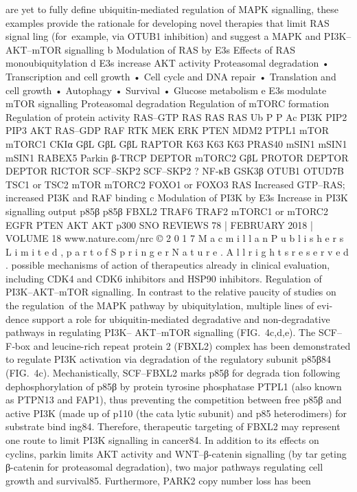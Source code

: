 are yet to fully define ubiquitin-mediated regulation of
MAPK signalling, these examples provide the rationale
for developing novel therapies that limit RAS signal­
ling (for example, via OTUB1 inhibition) and suggest
a MAPK and PI3K–AKT–mTOR signalling
b Modulation of RAS by E3s
Eﬀects of RAS monoubiquitylation
d E3s increase AKT activity
Proteasomal degradation
• Transcription and
   cell growth
• Cell cycle and
   DNA repair
• Translation and
    cell growth
• Autophagy
• Survival
• Glucose
   metabolism
e E3s modulate mTOR signalling
Proteasomal degradation
Regulation of mTORC formation
Regulation of protein activity
RAS–GTP
RAS
RAS
RAS
Ub
P
P
Ac
PI3K
PIP2
PIP3
AKT
RAS–GDP
RAF
RTK
MEK
ERK
PTEN
MDM2
PTPL1
mTOR
mTORC1
CKIα
GβL
GβL
GβL
RAPTOR
K63
K63
K63
PRAS40
mSIN1
mSIN1
mSIN1
RABEX5
Parkin
β-TRCP
DEPTOR
mTORC2
GβL
PROTOR
DEPTOR
DEPTOR
RICTOR
SCF–SKP2
SCF–SKP2
?
NF-κB
GSK3β
OTUB1
OTUD7B
TSC1 or
TSC2
mTOR
mTORC2
FOXO1 or
FOXO3
RAS
Increased GTP–RAS;
increased PI3K and
RAF binding
c Modulation of PI3K by E3s
Increase in PI3K signalling output
p85β
p85β
FBXL2
TRAF6
TRAF2
mTORC1 or
mTORC2
EGFR
PTEN
AKT
AKT
p300
SNO
REVIEWS
78 | FEBRUARY 2018 | VOLUME 18
www.nature.com/nrc
©
 2
0
1
7
 M
a
c
m
i
l
l
a
n
 P
u
b
l
i
s
h
e
r
s
 L
i
m
i
t
e
d
,
 p
a
r
t
 o
f
 S
p
r
i
n
g
e
r
 N
a
t
u
r
e
.
 A
l
l
 r
i
g
h
t
s
 r
e
s
e
r
v
e
d
.
possible mechanisms of action of therapeutics already
in clinical evaluation, including CDK4 and CDK6
­inhibitors and HSP90 inhibitors.
Regulation of PI3K–AKT–mTOR signalling. In contrast
to the relative paucity of studies on the regulation of the
MAPK pathway by ubiquitylation, multiple lines of evi­
dence support a role for ubiquitin-mediated degradative
and non-degradative pathways in regulating PI3K–
AKT–mTOR signalling (FIG. 4c,d,e). The SCF–F‑box
and leucine-rich repeat protein 2 (FBXL2) complex
has been demonstrated to regulate PI3K activation via
degradation of the regulatory subunit p85β84 (FIG. 4c).
Mechanistically, SCF–FBXL2 marks p85β for degrada­
tion following dephosphorylation of p85β by protein
tyrosine phosphatase PTPL1 (also known as PTPN13
and FAP1), thus preventing the competition between
free p85β and active PI3K (made up of p110 (the cata­
lytic subunit) and p85 heterodimers) for substrate bind­
ing84. Therefore, therapeutic targeting of FBXL2 may
represent one route to limit PI3K signalling in cancer84.
In addition to its effects on cyclins, parkin limits
AKT activity and WNT–β-catenin signalling (by tar­
geting β-catenin for proteasomal degradation), two
major pathways regulating cell growth and survival85.
Furthermore, PARK2 copy number loss has been
